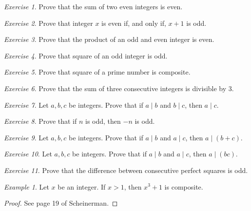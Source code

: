 \documentclass[11pt]{article}
\theoremstyle{plain}
\theoremstyle{definition}
\theoremstyle{remark}
\newtheorem{exm}{Example}[section]
\newtheorem{exc}{Exercise}[section]
\begin{document}
\begin{exc}
    Prove that the sum of two even integers is even.
\end{exc}
\begin{exc}
    Prove that integer $x$ is even if, and only if, $x + 1$ is odd.
\end{exc}
\begin{exc}
    Prove that the product of an odd and even integer is even.
\end{exc}
\begin{exc}
    Prove that square of an odd integer is odd.
\end{exc}
\begin{exc}
    Prove that square of a prime number is composite.
\end{exc}
\begin{exc}
    Prove that the sum of three consecutive integers is divisible by 3.
\end{exc}
\begin{exc}
    Let $a,b, c$ be integers. Prove that if $a \mid b$ and $b \mid c$, then $a \mid c$.
\end{exc}
\begin{exc}
    Prove that if $n$ is odd, then $-n$ is odd.
\end{exc}
\begin{exc}
    Let $a,b, c$ be integers. Prove that if $a \mid b$ and $a \mid c$, then $a \mid (b+c)$.
\end{exc}
\begin{exc}
    Let $a,b, c$ be integers. Prove that if $a \mid b$ and $a \mid c$, then $a \mid (bc)$.
\end{exc}
\begin{exc}
    Prove that the difference between consecutive perfect squares is odd.
\end{exc}

\begin{exm}
    Let $x$ be an integer. If $x > 1$, then $x^3 + 1$ is composite.
\end{exm}
\begin{proof}
    See page 19 of Scheinerman.
\end{proof}
\end{document}
